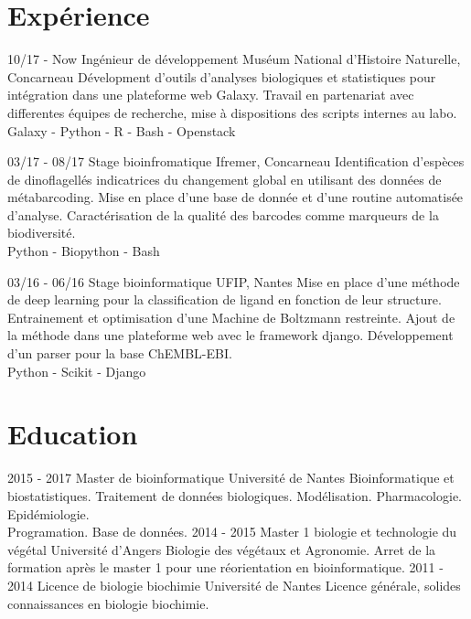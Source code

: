 \documentclass[]{friggeri-cv}
\begin{document}
\section{Expérience}
\begin{entrylist}
  \entry
    {10/17 - Now}
    {Ingénieur de développement}
    {Muséum National d'Histoire Naturelle, Concarneau}
    {Dévelopment d'outils d'analyses biologiques et statistiques pour intégration dans une plateforme web Galaxy. Travail en partenariat avec differentes équipes de recherche, mise à dispositions des scripts internes au labo.\\
    Galaxy - Python - R - Bash - Openstack}
    
  \entry
    {03/17 - 08/17}
    {Stage bioinfromatique}
    {Ifremer, Concarneau}
    {Identification d'espèces de dinoflagellés indicatrices du changement global en utilisant des données de métabarcoding. Mise en place d'une base de donnée et d'une routine automatisée d'analyse. Caractérisation de la qualité des barcodes comme marqueurs de la biodiversité.\\
    Python - Biopython - Bash}

    \entry
    {03/16 - 06/16}
    {Stage bioinformatique}
    {UFIP, Nantes}
    {Mise en place d'une méthode de deep learning pour la classification de ligand en fonction de leur structure. Entrainement et optimisation d'une Machine de Boltzmann restreinte. Ajout de la méthode dans une plateforme web avec le framework django. Développement d'un parser pour la base ChEMBL-EBI.\\
    Python - Scikit - Django}
\end{entrylist}

\section{Education}
\begin{entrylist}
  \entry
    {2015 - 2017}
    {Master de bioinformatique}
    {Université de Nantes}
    {Bioinformatique et biostatistiques. Traitement de données biologiques. Modélisation. Pharmacologie. Epidémiologie.\\
    Programation. Base de données.}
  \entry
    {2014 - 2015}
    {Master 1 biologie et technologie du végétal}
    {Université d'Angers}
    {Biologie des végétaux et Agronomie. Arret de la formation après le master 1 pour une réorientation en bioinformatique.}
  \entry
    {2011 - 2014}
    {Licence de biologie biochimie}
    {Université de Nantes}
    {Licence générale, solides connaissances en biologie biochimie.\\}
\end{entrylist}
\end{document}

